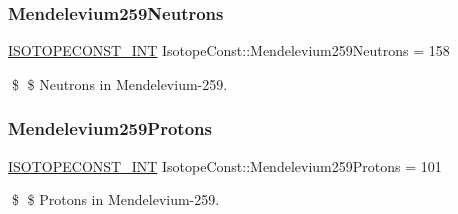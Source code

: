 \subsubsection{\texorpdfstring{Mendelevium259\+Neutrons}{Mendelevium259Neutrons}}
{\footnotesize\ttfamily \mbox{\hyperlink{group___isotope_const-_macros_ga5f18360b3e99483a35c32d789e62621c}{I\+S\+O\+T\+O\+P\+E\+C\+O\+N\+S\+T\+\_\+\+I\+NT}} Isotope\+Const\+::\+Mendelevium259\+Neutrons = 158}

\$ \$ Neutrons in Mendelevium-\/259. \mbox{\label{group___isotope_const-_mendelevium-_md259_ga559c07bd0ef7273c773a5ad9574dce0b}} 
\subsubsection{\texorpdfstring{Mendelevium259\+Protons}{Mendelevium259Protons}}
{\footnotesize\ttfamily \mbox{\hyperlink{group___isotope_const-_macros_ga5f18360b3e99483a35c32d789e62621c}{I\+S\+O\+T\+O\+P\+E\+C\+O\+N\+S\+T\+\_\+\+I\+NT}} Isotope\+Const\+::\+Mendelevium259\+Protons = 101}

\$ \$ Protons in Mendelevium-\/259. 